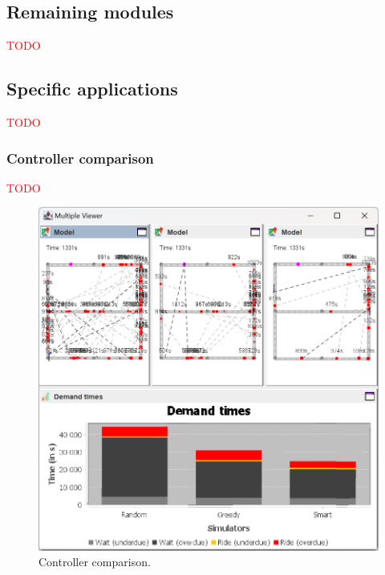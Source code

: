 \documentclass[10pt,twocolumn]{article}
\begin{document}





\subsection{Remaining modules}

\textcolor{red}{TODO}

\subsection{Specific applications}
\label{sec:application}

\textcolor{red}{TODO}

\subsubsection{Controller comparison}
\label{sec:controller-comparison}

\textcolor{red}{TODO}

\begin{figure}[!ht]
    \includegraphics[width=\columnwidth]{controller_comparison.png}
    \caption{Controller comparison.}
    \label{fig:controller-comparison}
\end{figure}
\end{document}
